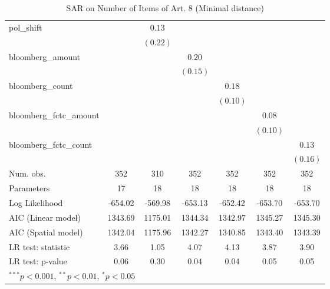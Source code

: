 \begin{table}[!h]
\begin{center}
\begin{tabular}{l c c c c c c }
pol\_shift              &              & $0.13$       &              &              &              &              \\
                        &              & $(0.22)$     &              &              &              &              \\
bloomberg\_amount       &              &              & $0.20$       &              &              &              \\
                        &              &              & $(0.15)$     &              &              &              \\
bloomberg\_count        &              &              &              & $0.18$       &              &              \\
                        &              &              &              & $(0.10)$     &              &              \\
bloomberg\_fctc\_amount &              &              &              &              & $0.08$       &              \\
                        &              &              &              &              & $(0.10)$     &              \\
bloomberg\_fctc\_count  &              &              &              &              &              & $0.13$       \\
                        &              &              &              &              &              & $(0.16)$     \\
\midrule
Num. obs.               & 352          & 310          & 352          & 352          & 352          & 352          \\
Parameters              & 17           & 18           & 18           & 18           & 18           & 18           \\
Log Likelihood          & -654.02      & -569.98      & -653.13      & -652.42      & -653.70      & -653.70      \\
AIC (Linear model)      & 1343.69      & 1175.01      & 1344.34      & 1342.97      & 1345.27      & 1345.30      \\
AIC (Spatial model)     & 1342.04      & 1175.96      & 1342.27      & 1340.85      & 1343.40      & 1343.39      \\
LR test: statistic      & 3.66         & 1.05         & 4.07         & 4.13         & 3.87         & 3.90         \\
LR test: p-value        & 0.06         & 0.30         & 0.04         & 0.04         & 0.05         & 0.05         \\
\bottomrule
\multicolumn{7}{l}{\scriptsize{$^{***}p<0.001$, $^{**}p<0.01$, $^*p<0.05$}}
\end{tabular}
\caption{SAR on Number of Items of Art. 8 (Minimal distance)}
\label{table:coefficients}
\end{center}
\end{table}
